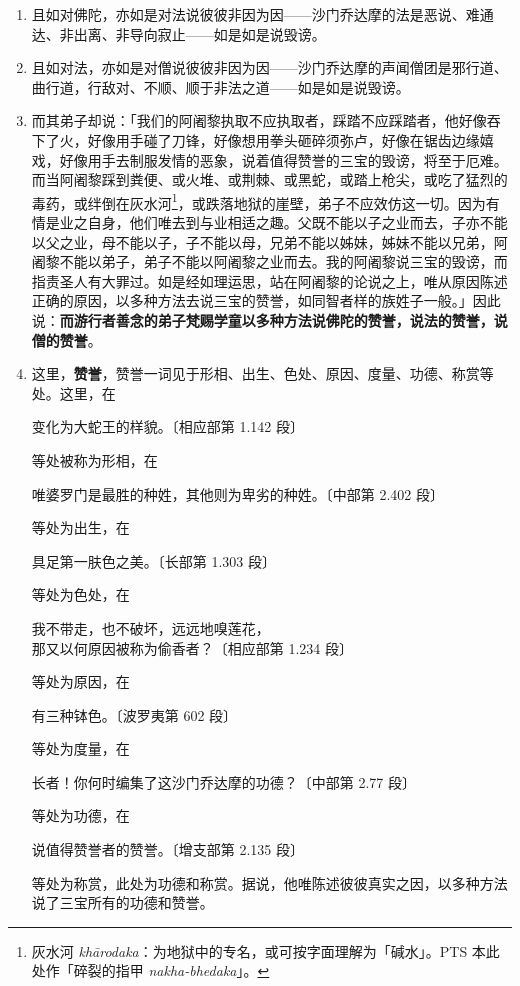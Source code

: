 \begin{enumerate}
\item 且如对佛陀，亦如是对法说彼彼非因为因——沙门乔达摩的法是恶说、难通达、非出离、非导向寂止——如是如是说毁谤。
\item 且如对法，亦如是对僧说彼彼非因为因——沙门乔达摩的声闻僧团是邪行道、曲行道，行敌对、不顺、顺于非法之道——如是如是说毁谤。
\item 而其弟子却说：「我们的阿阇黎执取不应执取者，踩踏不应踩踏者，他好像吞下了火，好像用手碰了刀锋，好像想用拳头砸碎须弥卢，好像在锯齿边缘嬉戏，好像用手去制服发情的恶象，说着值得赞誉的三宝的毁谤，将至于厄难。而当阿阇黎踩到粪便、或火堆、或荆棘、或黑蛇，或踏上枪尖，或吃了猛烈的毒药，或绊倒在灰水河\footnote{灰水河 \textit{khārodaka}：为地狱中的专名，或可按字面理解为「碱水」。PTS 本此处作「碎裂的指甲 \textit{nakha-bhedaka}」。}，或跌落地狱的崖壁，弟子不应效仿这一切。因为有情是业之自身，他们唯去到与业相适之趣。父既不能以子之业而去，子亦不能以父之业，母不能以子，子不能以母，兄弟不能以姊妹，姊妹不能以兄弟，阿阇黎不能以弟子，弟子不能以阿阇黎之业而去。我的阿阇黎说三宝的毁谤，而指责圣人有大罪过。如是经如理运思，站在阿阇黎的论说之上，唯从原因陈述正确的原因，以多种方法去说三宝的赞誉，如同智者样的族姓子一般。」因此说：\textbf{而游行者善念的弟子梵赐学童以多种方法说佛陀的赞誉，说法的赞誉，说僧的赞誉}。
\item 这里，\textbf{赞誉}，赞誉一词见于形相、出生、色处、原因、度量、功德、称赏等处。这里，在\begin{quoting}变化为大蛇王的样貌。{\bluefootnotesize 〔相应部第 1.142 段〕}\end{quoting}等处被称为形相，在\begin{quoting}唯婆罗门是最胜的种姓，其他则为卑劣的种姓。{\bluefootnotesize 〔中部第 2.402 段〕}\end{quoting}等处为出生，在\begin{quoting}具足第一肤色之美。{\bluefootnotesize 〔长部第 1.303 段〕}\end{quoting}等处为色处，在\begin{quoting}我不带走，也不破坏，远远地嗅莲花，\\那又以何原因被称为偷香者？{\bluefootnotesize 〔相应部第 1.234 段〕}\end{quoting}等处为原因，在\begin{quoting}有三种钵色。{\bluefootnotesize 〔波罗夷第 602 段〕}\end{quoting}等处为度量，在\begin{quoting}长者！你何时编集了这沙门乔达摩的功德？{\bluefootnotesize 〔中部第 2.77 段〕}\end{quoting}等处为功德，在\begin{quoting}说值得赞誉者的赞誉。{\bluefootnotesize 〔增支部第 2.135 段〕}\end{quoting}等处为称赏，此处为功德和称赏。据说，他唯陈述彼彼真实之因，以多种方法说了三宝所有的功德和赞誉。

\end{enumerate}
